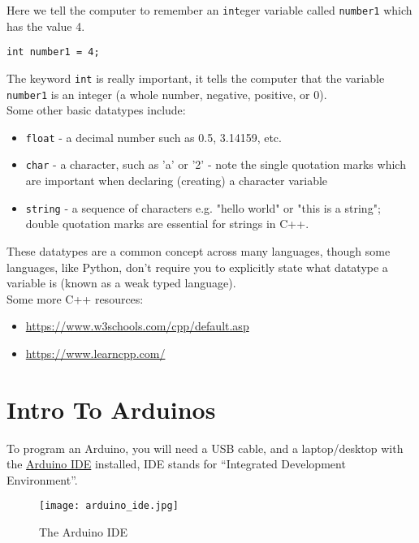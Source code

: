 \documentclass[../TinyBot.tex]{subfiles}
\begin{document}
Here we tell the computer to remember an \lstinline[]!int!eger variable called \lstinline[]!number1!
which has the value 4.
\begin{lstlisting}
int number1 = 4;
\end{lstlisting}

The keyword \lstinline[]!int! is really important, it tells the computer that the variable
\lstinline[]!number1! is an integer (a whole number, negative, positive, or 0). \\

Some other basic datatypes include:
\begin{itemize}[label={$\triangleright$}]
  \item \lstinline[]!float! - a decimal number such as 0.5, 3.14159, etc. 
  \item \lstinline[]!char! - a character, such as 'a' or '2' - note the single quotation marks which are important when declaring (creating) a character variable
  \item \lstinline[]!string! - a sequence of characters e.g. "hello world" or "this is a string"; double quotation marks are essential for strings in C++. 
\end{itemize}

These datatypes are a common concept across many languages, though some languages, like Python,
don't require you to explicitly state what datatype a variable is (known as a weak typed language). \\

Some more C++ resources:
\begin{itemize}[label={$\triangleright$}]
  \item \href{https://www.w3schools.com/cpp/default.asp}{https://www.w3schools.com/cpp/default.asp}
  \item \href{https://www.learncpp.com/}{https://www.learncpp.com/}
\end{itemize}

\section{Intro To Arduinos} \label{sec:introarduino}

To program an Arduino, you will need a USB cable, and a laptop/desktop with the
\href{https://www.arduino.cc/en/software}{Arduino IDE} installed, IDE stands for
``Integrated Development Environment''. \\

\begin{figure}[h]
    \centering
    \texttt{[image: arduino\_ide.jpg]}
    \caption{The Arduino IDE}
\end{figure}
\end{document}
